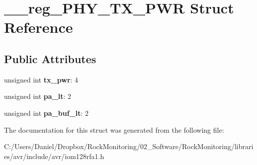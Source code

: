 \hypertarget{struct____reg___p_h_y___t_x___p_w_r}{}\section{\+\_\+\+\_\+reg\+\_\+\+P\+H\+Y\+\_\+\+T\+X\+\_\+\+P\+WR Struct Reference}
\label{struct____reg___p_h_y___t_x___p_w_r}
\subsection*{Public Attributes}
\begin{DoxyCompactItemize}
\item 
unsigned int {\bfseries tx\+\_\+pwr}\+: 4\hypertarget{struct____reg___p_h_y___t_x___p_w_r_a3f53b1610d4680349d6d4b01a0dc417b}{}\label{struct____reg___p_h_y___t_x___p_w_r_a3f53b1610d4680349d6d4b01a0dc417b}

\item 
unsigned int {\bfseries pa\+\_\+lt}\+: 2\hypertarget{struct____reg___p_h_y___t_x___p_w_r_a97c6be8096abd4a843e5ddfa3c6dbaf7}{}\label{struct____reg___p_h_y___t_x___p_w_r_a97c6be8096abd4a843e5ddfa3c6dbaf7}

\item 
unsigned int {\bfseries pa\+\_\+buf\+\_\+lt}\+: 2\hypertarget{struct____reg___p_h_y___t_x___p_w_r_a3b61f347196a25b5e1d494cf3610f064}{}\label{struct____reg___p_h_y___t_x___p_w_r_a3b61f347196a25b5e1d494cf3610f064}

\end{DoxyCompactItemize}


The documentation for this struct was generated from the following file\+:\begin{DoxyCompactItemize}
\item 
C\+:/\+Users/\+Daniel/\+Dropbox/\+Rock\+Monitoring/02\+\_\+\+Software/\+Rock\+Monitoring/libraries/avr/include/avr/iom128rfa1.\+h\end{DoxyCompactItemize}
